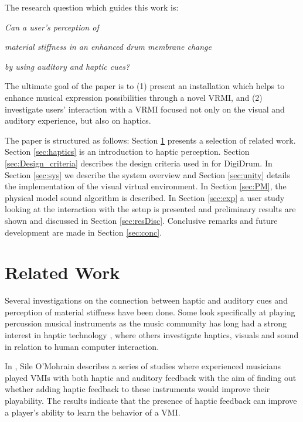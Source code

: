     The research question which guides this work is:
    \vspace{0.2cm}
    
    \centerline{\it Can a user's perception of}
    
    \centerline{\it material stiffness in an enhanced drum membrane change}
    
    \centerline{\it by using auditory and haptic cues?}
    \vspace{0.2cm}
    \noindent 
    
    The ultimate goal of the paper is to (1) present an installation which helps to enhance musical expression possibilities through a novel VRMI, and (2) investigate users' interaction with a VRMI focused not only on the visual and auditory experience, but also on haptics.
    
    The paper is structured as follows: 
     Section \ref{sec:relwork} presents a selection of related work. Section \ref{sec:haptics} is an introduction to haptic perception. Section \ref{sec:Design_criteria} describes the design criteria used in for DigiDrum. %
     In Section \ref{sec:sys} we describe the system overview and Section \ref{sec:unity} details the implementation of the visual virtual environment. In Section \ref{sec:PM}, the physical model sound algorithm is described. 
    In Section \ref{sec:exp} a user study looking at the interaction with the setup is presented and preliminary results are shown and discussed in Section \ref{sec:resDisc}. Conclusive remarks and future development are made in Section \ref{sec:conc}.
    
    \section{Related Work}\label{sec:relwork}
    
    Several investigations on the connection between haptic and auditory cues and perception of material stiffness have been done. Some look specifically at playing percussion musical instruments as the music community has long had a strong interest in haptic technology \cite{Berdahl2008PracticalHA}, where others investigate haptics, visuals and sound in relation to human computer interaction. 
    
    In \cite{O'Mohdrain:2001}, Sile O'Mohrain describes a series of studies where experienced musicians played VMIs with both haptic and auditory feedback with the aim of finding out whether adding haptic feedback to these instruments would improve their playability. The results indicate that the presence of haptic feedback can improve a player's ability to learn the behavior of a VMI.
    
